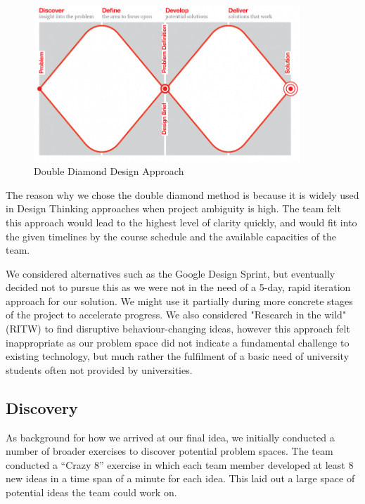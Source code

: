 \begin{figure}[H]
    \centering
    \includegraphics[width=10cm]{images/Double-Diamond-A3-for-publication-A-2000px_1.png}
    \caption{Double Diamond Design Approach}
    \label{fig:doublediamond}
\end{figure}

The reason why we chose the double diamond method is because it is widely used in Design Thinking \cite{interaction_design} approaches when project ambiguity is high. The team felt this approach would lead to the highest level of clarity quickly, and would fit into the given timelines by the course schedule and the available capacities of the team.

We considered alternatives such as the Google Design Sprint, but eventually decided not to pursue this as we were not in the need of a 5-day, rapid iteration approach for our solution. We might use it partially during more concrete stages of the project to accelerate progress. We also considered "Research in the wild" (RITW) to find disruptive behaviour-changing ideas, however this approach felt inappropriate as our problem space did not indicate a fundamental challenge to existing technology, but much rather the fulfilment of a basic need of university students often not provided by universities.

\subsection{Discovery}
As background for how we arrived at our final idea, we initially conducted a number of broader exercises to discover potential problem spaces. The team conducted a ``Crazy 8'' exercise in which each team member developed at least 8 new ideas in a time span of a minute for each idea. This laid out a large space of potential ideas the team could work on.

